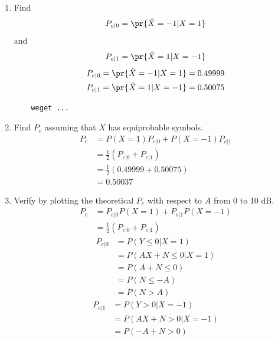 \documentclass[journal,12pt,twocolumn]{IEEEtran}
\renewcommand\thesection{\arabic{section}}
\begin{document}
\begin{enumerate}[label=\thesection.\arabic*
    ,ref=\thesection.\theenumi]
\begin{align}
   \hat{X} &= \begin{cases} -1 & Y<0\\ 1 & Y\ge \end{cases}
\end{align} 


\item Find 
\begin{equation}
	P_{e|0} = \pr{\hat{X} = -1|X=1}
\end{equation}
and 
\begin{equation}
	P_{e|1} = \pr{\hat{X} = 1|X=-1}
\end{equation}
\solution
\begin{align}
	P_{e|0} &= \pr{\hat{X} = -1|X=1} = 0.49999\\
	P_{e|1} &= \pr{\hat{X} = 1|X=-1} = 0.50075
\end{align}
\begin{lstlisting}
    weget ...
\end{lstlisting}
\item  Find $P_e$ assuming that $X$ has equiprobable symbols.\\
\solution
\begin{align}
    P_e &= P(X=1)P_{e|0} + P(X = -1)P_{e|1}\\
    &= \frac{1}{2}(P_{e|0} + P_{e|1})\\
    &= \frac{1}{2}(0.49999+0.50075)\\
    &= 0.50037
\end{align}
\item Verify by plotting  the theoretical $P_e$ with respect to $A$ from 0 to 10 dB.  \\
\solution
\begin{align}
    P_e &= P_{e|0}P(X = 1) + P_{e|1}P(X=-1)\\
    &= \frac{1}{2}(P_{e|0}+P_{e|1})
\end{align}
\begin{align}
    P_{e|0} &= P(Y\le0|X=1)\\
    &= P(AX+N \le 0|X=1)\\
    &= P(A+N\le0)\\
    &= P(N\le-A)\\
    &= P(N>A) 
\end{align}
\begin{align}
    P_{e|1} &= P(Y>0|X=-1)\\
    &= P(AX+N > 0|X=-1)\\
    &= P(-A+N>0)\\

\end{align}
\end{enumerate}
\end{document}
